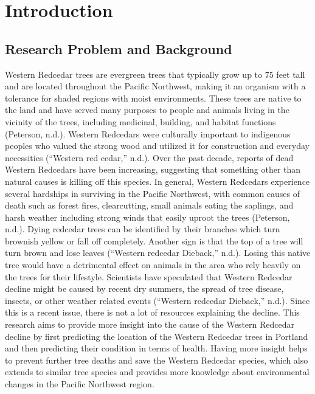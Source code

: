\documentclass[12pt,twoside]{reedthesis}
\begin{document}
\mainmatter %
\pagestyle{fancyplain} %

\hypertarget{introduction}{%
\chapter*{Introduction}\label{introduction}}

\hypertarget{research-problem-and-background}{%
\section{Research Problem and Background}\label{research-problem-and-background}}

Western Redcedar trees are evergreen trees that typically grow up to 75 feet tall and are located throughout the Pacific Northwest, making it an organism with a tolerance for shaded regions with moist environments. These trees are native to the land and have served many purposes to people and animals living in the vicinity of the trees, including medicinal, building, and habitat functions (Peterson, n.d.). Western Redcedars were culturally important to indigenous peoples who valued the strong wood and utilized it for construction and everyday necessities (``Western red cedar,'' n.d.). Over the past decade, reports of dead Western Redcedars have been increasing, suggesting that something other than natural causes is killing off this species. In general, Western Redcedars experience several hardships in surviving in the Pacific Northwest, with common causes of death such as forest fires, clearcutting, small animals eating the saplings, and harsh weather including strong winds that easily uproot the trees (Peterson, n.d.). Dying redcedar trees can be identified by their branches which turn brownish yellow or fall off completely. Another sign is that the top of a tree will turn brown and lose leaves (``Western redcedar Dieback,'' n.d.). Losing this native tree would have a detrimental effect on animals in the area who rely heavily on the trees for their lifestyle. Scientists have speculated that Western Redcedar decline might be caused by recent dry summers, the spread of tree disease, insects, or other weather related events (``Western redcedar Dieback,'' n.d.). Since this is a recent issue, there is not a lot of resources explaining the decline. This research aims to provide more insight into the cause of the Western Redcedar decline by first predicting the location of the Western Redcedar trees in Portland and then predicting their condition in terms of health. Having more insight helps to prevent further tree deaths and save the Western Redcedar species, which also extends to similar tree species and provides more knowledge about environmental changes in the Pacific Northwest region.
\end{document}
